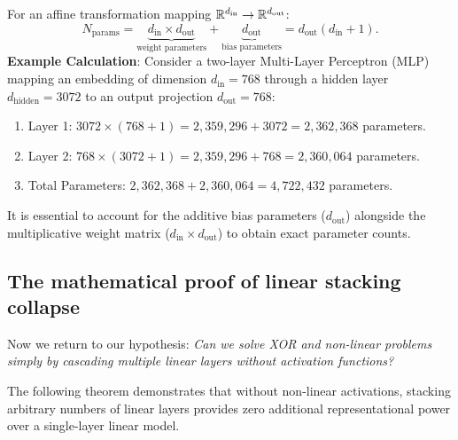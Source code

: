 \documentclass[../../main.tex]{subfiles}
\begin{document}
For an affine transformation mapping $\mathbb{R}^{d_{\text{in}}} \to \mathbb{R}^{d_{\text{out}}}$:
\begin{equation}
\label{eq:param_count_formula}
N_{\text{params}} = \underbrace{d_{\text{in}} \times d_{\text{out}}}_{\text{weight parameters}} + \underbrace{d_{\text{out}}}_{\text{bias parameters}} = d_{\text{out}}(d_{\text{in}} + 1).
\end{equation}
\textbf{Example Calculation}: Consider a two-layer Multi-Layer Perceptron (MLP) mapping an embedding of dimension $d_{\text{in}} = 768$ through a hidden layer $d_{\text{hidden}} = 3072$ to an output projection $d_{\text{out}} = 768$:
\begin{enumerate}
    \item Layer 1: $3072 \times (768 + 1) = 2{,}359{,}296 + 3072 = 2{,}362{,}368$ parameters.
    \item Layer 2: $768 \times (3072 + 1) = 2{,}359{,}296 + 768 = 2{,}360{,}064$ parameters.
    \item Total Parameters: $2{,}362{,}368 + 2{,}360{,}064 = 4{,}722{,}432$ parameters.
\end{enumerate}
It is essential to account for the additive bias parameters ($d_{\text{out}}$) alongside the multiplicative weight matrix ($d_{\text{in}} \times d_{\text{out}}$) to obtain exact parameter counts.

\subsection{The mathematical proof of linear stacking collapse}
Now we return to our hypothesis: \emph{Can we solve XOR and non-linear problems simply by cascading multiple linear layers without activation functions?}

The following theorem demonstrates that without non-linear activations, stacking arbitrary numbers of linear layers provides zero additional representational power over a single-layer linear model.
\end{document}
